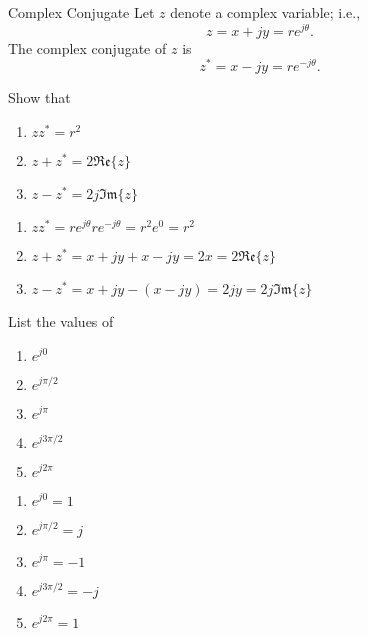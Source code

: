 \begin{frame}{Complex Conjugate}
    Let $z$ denote a complex variable; i.e.,
    \begin{equation*}
        z = x + jy = re^{j\theta}.
    \end{equation*}
    The \alert{complex conjugate} of $z$ is
    \begin{equation*}
        z^\ast = x - jy = re^{-j\theta}.
    \end{equation*}
\end{frame}

\begin{frame}
    Show that
    \begin{enumerate}
      \item $zz^\ast = r^2$
      \item $z + z^\ast = 2\mathfrak{Re}\{z\}$
      \item $z - z^\ast = 2j\mathfrak{Im}\{z\}$
    \end{enumerate}
    \pause
    \begin{enumerate}
      \item $zz^\ast = re^{j\theta}re^{-j\theta} = r^2e^0 = r^2$
      \item $ z + z^\ast  = x + jy + x - jy  = 2x = 2\mathfrak{Re}\{z\}$
      \item $ z - z^\ast  = x + jy - (x - jy)  = 2jy = 2j\mathfrak{Im}\{z\}$
    \end{enumerate}
    \pause
    List the values of
    \begin{overprint}
        \begin{enumerate}
          \item $e^{j0}$
          \item $e^{j\pi/2}$
          \item $e^{j\pi}$
          \item $e^{j3\pi/2}$
          \item $e^{j2\pi}$
        \end{enumerate}
        \begin{enumerate}
          \item $e^{j0} = 1$
          \item $e^{j\pi/2} = j$
          \item $e^{j\pi} = -1$
          \item $e^{j3\pi/2} = -j$
          \item $e^{j2\pi} = 1$
        \end{enumerate}
    \end{overprint}

\end{frame} 